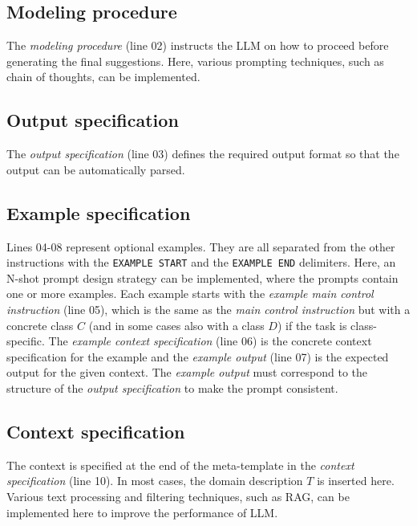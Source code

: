 \subsection{Modeling procedure}

The \textit{modeling procedure} (line 02) instructs the LLM on how to proceed before generating the final suggestions. Here, various prompting techniques, such as chain of thoughts, can be implemented.


\subsection{Output specification}

The \textit{output specification} (line 03) defines the required output format so that the output can be automatically parsed.


\subsection{Example specification}

Lines 04-08 represent optional examples. They are all separated from the other instructions with the \texttt{EXAMPLE START} and the \texttt{EXAMPLE END} delimiters. Here, an N-shot prompt design strategy can be implemented, where the prompts contain one or more examples. Each example starts with the \emph{example main control instruction} (line 05), which is the same as the \emph{main control instruction} but with a concrete class $C$ (and in some cases also with a class $D$) if the task is class-specific. The \emph{example context specification} (line 06) is the concrete context specification for the example and the \emph{example output} (line 07) is the expected output for the given context. The \emph{example output} must correspond to the structure of the \emph{output specification} to make the prompt consistent.


\subsection{Context specification}

The context is specified at the end of the meta-template in the \emph{context specification} (line 10). In most cases, the domain description $T$ is inserted here. Various text processing and filtering techniques, such as RAG, can be implemented here to improve the performance of LLM.